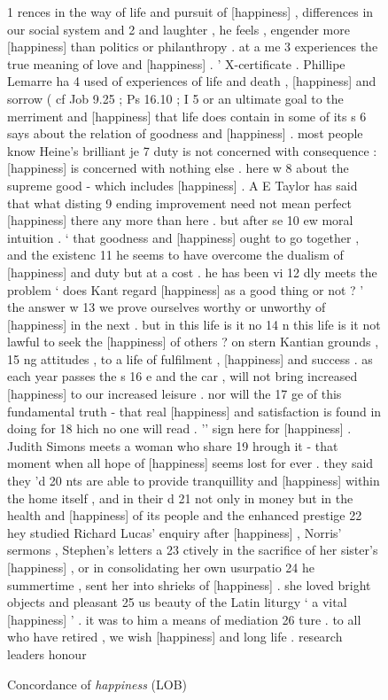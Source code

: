\begin{figure}[!htbp]
\caption{Concordance of \textit{happiness} (LOB)}
\label{fig:happinesslobconc}
\begin{fitverb}
 1 rences in the way of life and pursuit of [happiness] , differences in our social system and 
 2  and laughter , he feels , engender more [happiness] than politics or philanthropy . at a me
 3 experiences the true meaning of love and [happiness] . ' X-certificate . Phillipe Lemarre ha
 4  used of experiences of life and death , [happiness] and sorrow ( cf Job 9.25 ; Ps 16.10 ; I
 5 or an ultimate goal to the merriment and [happiness] that life does contain in some of its s
 6  says about the relation of goodness and [happiness] . most people know Heine's brilliant je
 7 duty is not concerned with consequence : [happiness] is concerned with nothing else . here w
 8  about the supreme good - which includes [happiness] . A E Taylor has said that what disting
 9 ending improvement need not mean perfect [happiness] there any more than here . but after se
10 ew moral intuition . ` that goodness and [happiness] ought to go together , and the existenc
11 he seems to have overcome the dualism of [happiness] and duty but at a cost . he has been vi
12 dly meets the problem ` does Kant regard [happiness] as a good thing or not ? ' the answer w
13 we prove ourselves worthy or unworthy of [happiness] in the next . but in this life is it no
14 n this life is it not lawful to seek the [happiness] of others ? on stern Kantian grounds , 
15 ng attitudes , to a life of fulfilment , [happiness] and success . as each year passes the s
16 e and the car , will not bring increased [happiness] to our increased leisure . nor will the
17 ge of this fundamental truth - that real [happiness] and satisfaction is found in doing for 
18 hich no one will read . '' sign here for [happiness] . Judith Simons meets a woman who share
19 hrough it - that moment when all hope of [happiness] seems lost for ever . they said they 'd
20 nts are able to provide tranquillity and [happiness] within the home itself , and in their d
21  not only in money but in the health and [happiness] of its people and the enhanced prestige
22 hey studied Richard Lucas' enquiry after [happiness] , Norris' sermons , Stephen's letters a
23 ctively in the sacrifice of her sister's [happiness] , or in consolidating her own usurpatio
24 he summertime , sent her into shrieks of [happiness] . she loved bright objects and pleasant
25 us beauty of the Latin liturgy ` a vital [happiness] ' . it was to him a means of mediation 
26 ture . to all who have retired , we wish [happiness] and long life . research leaders honour

\end{fitverb}
\end{figure}
